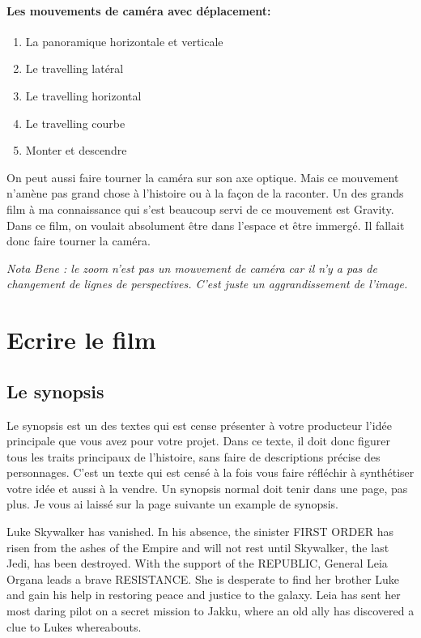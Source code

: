 \documentclass{article}
\begin{document}
	\paragraph{Les mouvements de caméra avec déplacement:}
\begin{enumerate}
	\item La panoramique horizontale et verticale
	\item Le travelling latéral
	\item Le travelling horizontal
	\item Le travelling courbe
	\item Monter et descendre
\end{enumerate}

On peut aussi faire tourner la caméra sur son axe optique. Mais ce mouvement n'amène pas grand chose à l'histoire ou à la façon de la raconter. Un des grands film à ma connaissance qui s'est beaucoup servi de ce mouvement est Gravity. Dans ce film, on voulait absolument être dans l'espace et être immergé. Il fallait donc faire tourner la caméra.

\smallskip

\textit{Nota Bene : le zoom n'est pas un mouvement de caméra car il n'y a pas de changement de lignes de perspectives. C'est juste un aggrandissement de l'image.}

\clearpage

\section{Ecrire le film}
	\subsection{Le synopsis}

Le synopsis est un des textes qui est cense présenter à votre producteur l'idée principale que vous avez pour votre projet. Dans ce texte, il doit donc figurer tous les traits principaux de l'histoire, sans faire de descriptions précise des personnages. C'est un texte qui est censé à la fois vous faire réfléchir à synthétiser votre idée et aussi à la vendre. Un synopsis normal doit tenir dans une page, pas plus. Je vous ai laissé sur la page suivante un example de synopsis.

\clearpage

Luke Skywalker has vanished. In his absence, the sinister FIRST ORDER has risen from the ashes of the Empire and will not rest until Skywalker, the last Jedi, has been destroyed. With the support of the REPUBLIC, General Leia Organa leads a brave RESISTANCE. She is desperate to find her brother Luke and gain his help in restoring peace and justice to the galaxy. Leia has sent her most daring pilot on a secret mission to Jakku, where an old ally has discovered a clue to Lukes whereabouts.
\end{document}
